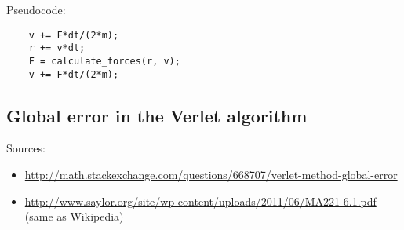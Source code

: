 Pseudocode: 
\begin{verbatim}
    v += F*dt/(2*m);
    r += v*dt;
    F = calculate_forces(r, v);
    v += F*dt/(2*m);
\end{verbatim}




\subsection{Global error in the Verlet algorithm}
Sources:
\begin{itemize}
    \item \url{http://math.stackexchange.com/questions/668707/verlet-method-global-error}
    \item \url{http://www.saylor.org/site/wp-content/uploads/2011/06/MA221-6.1.pdf} (same as Wikipedia)
\end{itemize}

